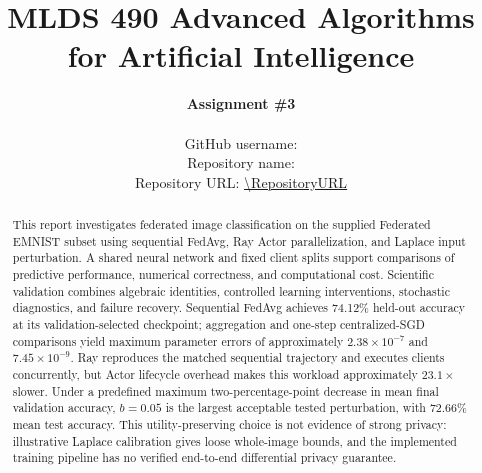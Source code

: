 \documentclass[11pt,letterpaper]{article}
\title{\textbf{MLDS 490 Advanced Algorithms for Artificial Intelligence}}
\author{\textbf{Assignment \#3}\\
\StudentName\\
\small GitHub username: \texttt{\GitHubUsername}\\
\small Repository name: \texttt{\RepositoryName}\\
\small Repository URL: \expandafter\url\expandafter{\RepositoryURL}}
\date{\SubmissionDate}
\begin{document}
\maketitle
\begin{abstract}
This report investigates federated image classification on the supplied Federated EMNIST subset using sequential FedAvg, Ray Actor parallelization, and Laplace input perturbation. A shared neural network and fixed client splits support comparisons of predictive performance, numerical correctness, and computational cost. Scientific validation combines algebraic identities, controlled learning interventions, stochastic diagnostics, and failure recovery. Sequential FedAvg achieves 74.12\% held-out accuracy at its validation-selected checkpoint; aggregation and one-step centralized-SGD comparisons yield maximum parameter errors of approximately $2.38\times10^{-7}$ and $7.45\times10^{-9}$. Ray reproduces the matched sequential trajectory and executes clients concurrently, but Actor lifecycle overhead makes this workload approximately $23.1\times$ slower. Under a predefined maximum two-percentage-point decrease in mean final validation accuracy, $b=0.05$ is the largest acceptable tested perturbation, with 72.66\% mean test accuracy. This utility-preserving choice is not evidence of strong privacy: illustrative Laplace calibration gives loose whole-image bounds, and the implemented training pipeline has no verified end-to-end differential privacy guarantee.
\end{abstract}




\FloatBarrier


\FloatBarrier




\FloatBarrier


\clearpage
\appendix

\end{document}
